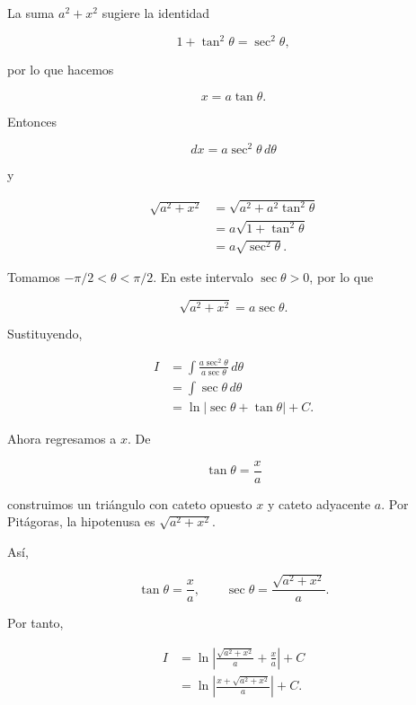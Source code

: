 \documentclass[12pt]{article}
\theoremstyle{definition}
\theoremstyle{remark}
\begin{document}
La suma $a^2+x^2$ sugiere la identidad

\[
1+\tan^2\theta=\sec^2\theta,
\]

por lo que hacemos

\[
\boxed{x=a\tan\theta}.
\]

Entonces

\[
dx=a\sec^2\theta\,d\theta
\]

y

\begin{align*}
\sqrt{a^2+x^2}
&=\sqrt{a^2+a^2\tan^2\theta}\\
&=a\sqrt{1+\tan^2\theta}\\
&=a\sqrt{\sec^2\theta}.
\end{align*}

Tomamos $-\pi/2<\theta<\pi/2$. En este intervalo $\sec\theta>0$, por lo que

\[
\sqrt{a^2+x^2}=a\sec\theta.
\]

Sustituyendo,

\begin{align*}
I
&=\int\frac{a\sec^2\theta}{a\sec\theta}\,d\theta\\
&=\int\sec\theta\,d\theta\\
&=\ln|\sec\theta+\tan\theta|+C.
\end{align*}

Ahora regresamos a $x$. De

\[
\tan\theta=\frac{x}{a}
\]

construimos un triángulo con cateto opuesto $x$ y cateto adyacente $a$. Por Pitágoras, la hipotenusa es $\sqrt{a^2+x^2}$.

\begin{center}
\end{center}

Así,

\[
\tan\theta=\frac{x}{a},
\qquad
\sec\theta=\frac{\sqrt{a^2+x^2}}{a}.
\]

Por tanto,

\begin{align*}
I
&=\ln\left|
\frac{\sqrt{a^2+x^2}}{a}+\frac{x}{a}
\right|+C\\
&=\ln\left|
\frac{x+\sqrt{a^2+x^2}}{a}
\right|+C.
\end{align*}
\end{document}
